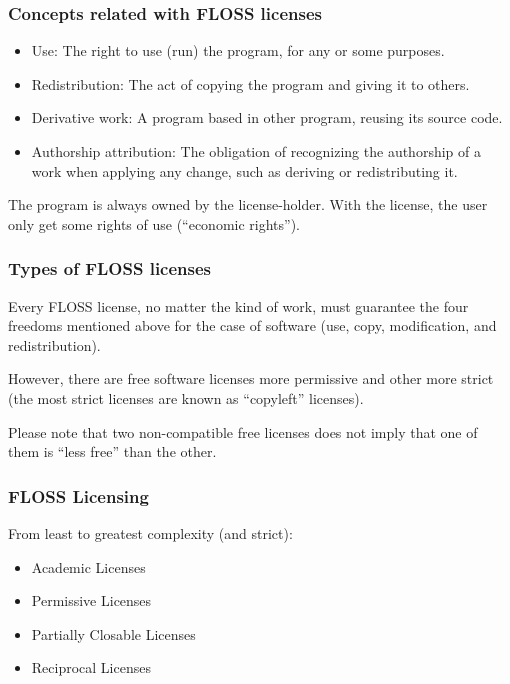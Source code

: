 
\begin{frame}
\frametitle{Concepts related with FLOSS licenses}

\begin{itemize}
\item \alert{Use}: The right to use (run) the program, for any or some
  purposes.
\item \alert{Redistribution}: The act of copying the program and giving it to
  others.
\item \alert{Derivative work}: A program based in other program, reusing its
  source code.
\item \alert{Authorship attribution}: The obligation of recognizing the
  authorship of a work when applying any change, such as deriving or
  redistributing it.
\end{itemize}

The program is always owned by the license-holder. With the license, the user only get some rights of use (``economic rights'').

\end{frame}


\begin{frame}
\frametitle{Types of FLOSS licenses}
Every \alert{FLOSS license}, no matter the kind of work, must guarantee the \alert{four freedoms} mentioned above for the case of software (use, copy, modification, and redistribution).\\\pause

\medskip

However, there are free software licenses more permissive and other more strict (the most strict licenses are known as ``copyleft'' licenses). \\\pause

\medskip

Please note that two non-compatible free licenses does not imply that one of them is ``less free'' than the other. 

\end{frame}



\begin{frame}
\frametitle{FLOSS Licensing}

From least to greatest complexity (and strict):
\begin{itemize}
\item \alert{Academic Licenses}
\item \alert{Permissive Licenses}
\item \alert{Partially Closable Licenses}
\item \alert{Reciprocal Licenses}
\end{itemize}

\end{frame}

